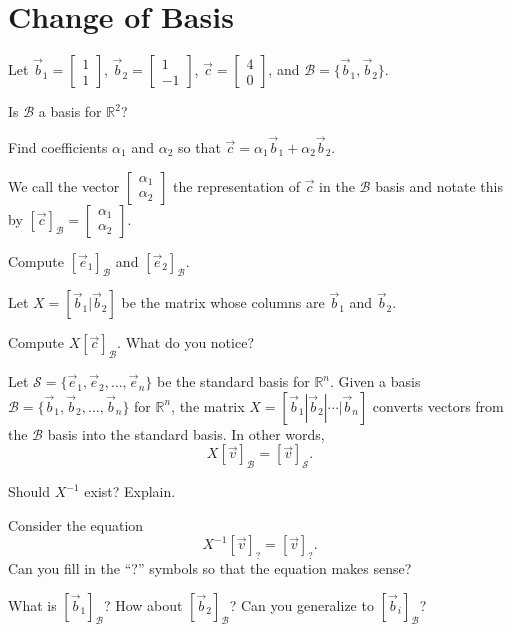 \documentclass{problemset}
\newcommand{\R}{\mathbb{R}}
\newcommand{\mat}[1]{\begin{bmatrix}#1\end{bmatrix}}
\begin{document}
\section*{Change of Basis}
	\question
	Let $\vec b_1=\mat{1\\1}$, $\vec b_2=\mat{1\\-1}$, $\vec c=\mat{4\\0}$, and $\mathcal B=\{\vec b_1,\vec b_2\}$.
	\begin{parts}
		\item Is $\mathcal B$ a basis for $\R^2$?
		\item Find coefficients $\alpha_1$ and $\alpha_2$ so that $\vec c=\alpha_1\vec b_1+\alpha_2\vec b_2$.
	\end{parts}
	We call the vector $\mat{\alpha_1\\\alpha_2}$ the representation of $\vec c$ in the $\mathcal B$ basis and notate
	this by $[\vec c]_{\mathcal B}=\mat{\alpha_1\\\alpha_2}$.
	\begin{parts}[resume]
		\item Compute $[\vec e_1]_{\mathcal B}$ and $[\vec e_2]_{\mathcal B}$.
	\end{parts}
	Let $X=[\vec b_1|\vec b_2]$ be the matrix whose columns are $\vec b_1$ and $\vec b_2$.
	\begin{parts}[resume]
		\item Compute $X[\vec c]_{\mathcal B}$.  What do you notice?
	\end{parts}

	
	\question
	Let $\mathcal S=\{\vec e_1,\vec e_2,\ldots,\vec e_n\}$ be the standard basis for $\R^n$.
	Given a basis $\mathcal B=\{\vec b_1,\vec b_2,\ldots,\vec b_n\}$ for $\R^n$, the 
	matrix $X=[\vec b_1|\vec b_2|\cdots|\vec b_n]$ converts
	vectors from the $\mathcal B$ basis into the standard basis.  In other words,
	\[
		X[\vec v]_{\mathcal B} = [\vec v]_{\mathcal S}.
	\]
	\begin{parts}
		\item Should $X^{-1}$ exist? Explain.
		\item Consider the equation\[
				X^{-1}[\vec v]_{?} = [\vec v]_{?}.
			\]
			Can you fill in the ``?'' symbols so that the equation makes sense?
		\item What is $[\vec b_1]_{\mathcal B}$?  How about $[\vec b_2]_{\mathcal B}$?  Can
			you generalize to $[\vec b_i]_{\mathcal B}$?
	\end{parts}
\end{document}
